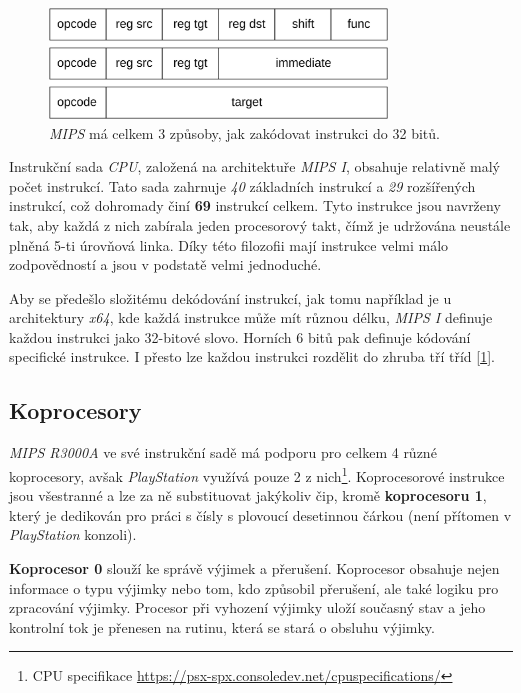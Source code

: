 \begin{figure}[hbt]
	\centering
	\includegraphics[width=0.8\textwidth]{obrazky-figures/instruction.png}
	\caption{\textit{MIPS} má celkem 3 způsoby, jak zakódovat instrukci do 32 bitů.}
	\label{instruction}
\end{figure}

Instrukční sada \textit{CPU}, založená na architektuře \textit{MIPS I}, obsahuje relativně malý počet instrukcí. 
Tato sada zahrnuje \textit{40} základních instrukcí a \textit{29} rozšířených instrukcí, což dohromady činí \textbf{69} instrukcí celkem\cite{MIPSInsSpec}. 
Tyto instrukce jsou navrženy tak, aby každá z nich zabírala jeden procesorový takt, čímž je udržována neustále plněná 5-ti úrovňová linka. 
Díky této filozofii mají instrukce velmi málo zodpovědností a jsou v podstatě velmi jednoduché.

Aby se předešlo složitému dekódování instrukcí, jak tomu například je u architektury \textit{x64}, 
kde každá instrukce může mít různou délku, \textit{MIPS I} definuje každou instrukci jako 32-bitové slovo. 
Horních 6 bitů pak definuje kódování specifické instrukce. I přesto lze každou instrukci rozdělit do zhruba tří tříd [\ref{instruction}].

\subsection{Koprocesory}

\textit{MIPS R3000A} ve své instrukční sadě má podporu pro celkem 4 různé koprocesory, avšak \textit{PlayStation} využívá pouze 2 z nich\footnote{CPU specifikace\cite{PSXSpec} \url{https://psx-spx.consoledev.net/cpuspecifications/}}. 
Koprocesorové instrukce jsou všestranné a lze za ně substituovat jakýkoliv čip, kromě \textbf{koprocesoru 1}, který je dedikován pro práci s čísly s plovoucí desetinnou čárkou (není přítomen v \textit{PlayStation} konzoli)\cite{MIPSInsSpec}.

\textbf{Koprocesor 0} slouží ke správě výjimek a přerušení. 
Koprocesor obsahuje nejen informace o typu výjimky nebo tom, kdo způsobil přerušení, ale také logiku pro zpracování výjimky. 
Procesor při vyhození výjimky uloží současný stav a jeho kontrolní tok je přenesen na rutinu, která se stará o obsluhu výjimky.

